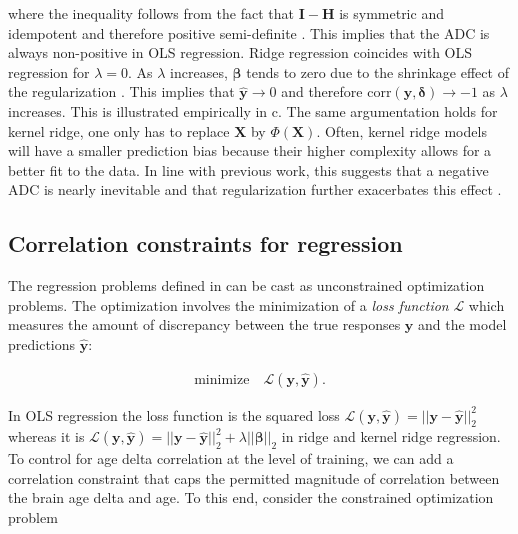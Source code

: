 \documentclass[utf8]{frontiersSCNS} %
\renewcommand{\b}{\boldsymbol{\beta}} %
\renewcommand{\d}{\boldsymbol{\delta}}
\renewcommand{\H}{\mathbf{H}}
\newcommand{\I}{\mathbf{I}}
\renewcommand{\L}{\mathcal{L}}
\newcommand{\X}{\mathbf{X}}
\newcommand{\yhat}{\hat{y}}
\newcommand{\y}{\mathbf{y}}
\newcommand{\yh}{\mathbf{\hat{y}}}
\begin{document}
where the inequality follows from the fact that  $\I-\H$ is symmetric and idempotent and therefore positive semi-definite \citep{Draper1966AppliedAnalysis}. This implies that the ADC is always non-positive in OLS regression.
Ridge regression coincides with OLS regression 
for $\lambda=0$. As  $\lambda$ increases, $\b$ tends to zero due to the shrinkage effect of the regularization \citep{Marquardt1975RidgePractice}. This implies that $\yh\rightarrow 0$ and therefore $\text{corr}(\y,\d)\rightarrow -1$ as $\lambda$ increases. This is illustrated empirically in c. The same argumentation holds for kernel ridge, one only has to replace $\X$ by $\Phi(\X)$. Often, kernel ridge models will have a smaller prediction bias because their higher complexity allows for a better fit to the data. In line with previous work, this suggests that a negative ADC is nearly inevitable and that regularization further exacerbates this effect \citep{Le2018ABrainAGE,Smith2019EstimationImaging}.

\subsection{Correlation constraints for regression}\label{sec:correlation_constraints}


The regression problems defined in  can be cast as  unconstrained optimization problems. The optimization involves the minimization of a \textit{loss function} $\L$ which measures the amount of discrepancy between the true responses $\y$ and the model predictions $\yh$:

\begin{equation}\label{eq:unconstrained_problem}
\begin{split}
    \text{minimize}\quad \L(\y,\yh).
\end{split}
\end{equation}

In OLS regression the loss function is the squared loss $\L(\y,\yh)=||\y-\yh||_2^2$ whereas it is $\L(\y,\yh)=||\y-\yh||_2^2 + \lambda||\b||_2$ in ridge and kernel ridge regression. To control for age delta correlation at the level of training, we can add a correlation constraint that caps the permitted magnitude of correlation between the brain age delta and age. To this end, consider the constrained optimization problem
\end{document}
